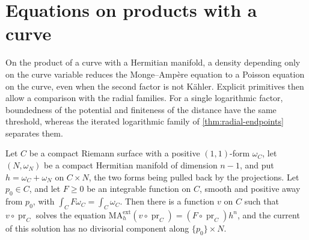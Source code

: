 \section{Equations on products with a curve}\label{sec:curves}

On the product of a curve with a Hermitian manifold, a density depending only on the curve variable reduces the Monge--Amp\`ere equation to a Poisson equation on the curve, even when the second factor is not K\"ahler. Explicit primitives then allow a comparison with the radial families. For a single logarithmic factor, boundedness of the potential and finiteness of the distance have the same threshold, whereas the iterated logarithmic family of \cref{thm:radial-endpoints} separates them.

\begin{theorem}\label{thm:curve-products}
Let $C$ be a compact Riemann surface with a positive $(1,1)$-form $\omega_C$, let $(N,\omega_N)$ be a compact Hermitian manifold of dimension $n-1$, and put $h=\omega_C+\omega_N$ on $C\times N$, the two forms being pulled back by the projections. Let $p_0\in C$, and let $F\geq0$ be an integrable function on $C$, smooth and positive away from $p_0$, with $\int_CF\omega_C=\int_C\omega_C$. Then there is a function $v$ on $C$ such that $v\circ\operatorname{pr}_C$ solves the equation $\mathrm{MA}^{\mathrm{ext}}_h(v\circ\operatorname{pr}_C)=(F\circ\operatorname{pr}_C)h^n$, and the current of this solution has no divisorial component along $\{p_0\}\times N$.


\end{theorem}
